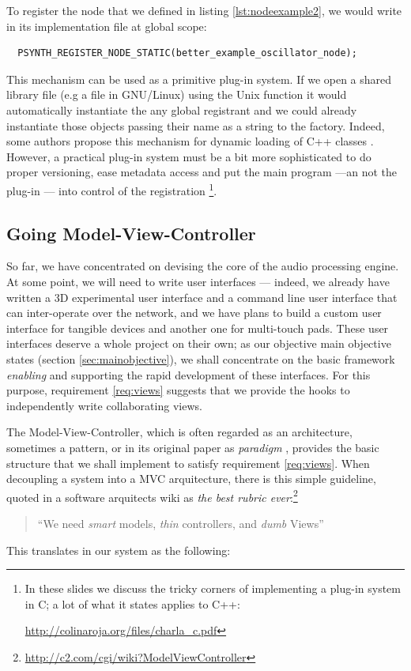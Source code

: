 To register the node that we defined in listing
\ref{lst:nodeexample2}, we would write in its 
implementation file at global scope:
\begin{lstlisting}
  PSYNTH_REGISTER_NODE_STATIC(better_example_oscillator_node);
\end{lstlisting}

This mechanism can be used as a primitive plug-in system. If we open a
shared library file (e.g a  file in GNU/Linux) using the
Unix  function it would automatically instantiate the
any global registrant and we could already instantiate those objects
passing their name as a string to the factory. Indeed, some authors
propose this mechanism for dynamic loading of C++ classes
\cite{norton00dynamic, beveridge98self}. However, a practical plug-in
system must be a bit more sophisticated to do proper versioning, ease
metadata access and put the main program ---an not the plug-in ---
into control of the registration \footnote{In these slides we discuss
  the tricky corners of implementing a plug-in system in C; a lot of
  what it states applies to C++:

\url{http://colinaroja.org/files/charla_c.pdf}}.

\subsection{Going Model-View-Controller}

So far, we have concentrated on devising the core of the audio
processing engine. At some point, we will need to write user
interfaces --- indeed, we already have written a 3D experimental user
interface and a command line user interface that can inter-operate
over the network, and we have plans to build a custom user interface
for tangible devices and another one for multi-touch pads. These user
interfaces deserve a whole project on their own; as our objective main
objective states (section \ref{sec:mainobjective}), we shall
concentrate on the basic framework \emph{enabling} and supporting the
rapid development of these interfaces. For this purpose, requirement
\ref{req:views} suggests that we provide the hooks to independently
write collaborating views.

The Model-View-Controller, which is often regarded as an architecture,
sometimes a pattern, or in its original paper as \emph{paradigm}
\cite{krasner88mvc}, provides the basic structure that we shall
implement to satisfy requirement \ref{req:views}. When decoupling a
system into a MVC arquitecture, there is this simple guideline, quoted
in a software arquitects wiki as \emph{the best rubric
  ever}:\footnote{\url{http://c2.com/cgi/wiki?ModelViewController}}
\begin{quote}
  ``We need \emph{smart} models, \emph{thin} controllers, and
  \emph{dumb} Views''
\end{quote}
This translates in our system as the following:

